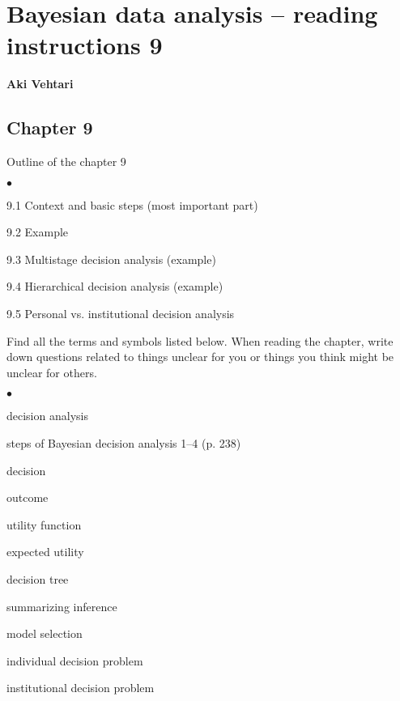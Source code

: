 \documentclass[a4paper,11pt,english]{article}
\begin{document}
\thispagestyle{empty}

\section*{Bayesian data analysis -- reading instructions 9} 
\smallskip
{\bf Aki Vehtari}
\smallskip

\subsection*{Chapter 9}

Outline of the chapter 9
\begin{list}{$\bullet$}{\parsep=0pt\itemsep=2pt}
\item 9.1 Context and basic steps (most important part)
\item 9.2 Example
\item 9.3 Multistage decision analysis (example)
\item 9.4 Hierarchical decision analysis (example)
\item 9.5 Personal vs. institutional decision analysis
\end{list}

Find all the terms and symbols listed below. When reading the chapter,
write down questions related to things unclear for you or things you
think might be unclear for others. 
\begin{list}{$\bullet$}{\parsep=0pt\itemsep=2pt}
\item decision analysis
\item steps of Bayesian decision analysis 1--4 (p. 238)
\item decision
\item outcome
\item utility function
\item expected utility
\item decision tree
\item summarizing inference
\item model selection
\item individual decision problem
\item institutional decision problem
\end{list}
\end{document}
